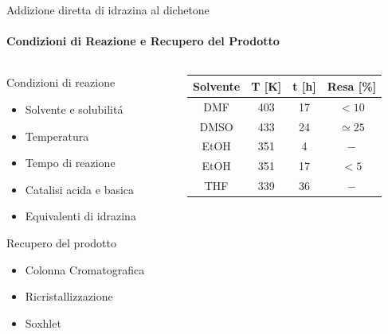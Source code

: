 \documentclass[aspectration=169]{beamer}
\begin{document}
\begin{frame}{Addizione diretta di idrazina al dichetone}
	\framesubtitle{Condizioni di Reazione e Recupero del Prodotto}
	\begin{columns}
		\hspace{1cm}
		\begin{column}{0.5\textwidth}
			Condizioni di reazione
			\begin{itemize}
				\small
				\item Solvente e solubilitá
				\item Temperatura
				\item Tempo di reazione
				\item Catalisi acida e basica
				\item Equivalenti di idrazina
			\end{itemize}
			\vspace{0.2cm}
			Recupero del prodotto
			\begin{itemize}
				\item Colonna Cromatografica
				\item Ricristallizzazione
				\item Soxhlet
			\end{itemize}
			\vspace*{-1cm}
		\end{column}
		\hspace{-3cm}
		\begin{column}{0.5\textwidth}
			\begin{footnotesize}
				\begin{center}
					\begin{tabular}{cccc}
						\toprule
						{Solvente} & T [K] & t [h] & Resa [\%]     \\
						\midrule
						DMF        & 403   & 17    & \(< 10\)      \\
						DMSO       & 433   & 24    & \(\simeq 25\) \\
						EtOH       & 351   & 4     & \(-\)         \\
						EtOH       & 351   & 17    & \(< 5\)       \\
						THF        & 339   & 36    & \(-\)         \\
						\bottomrule
					\end{tabular}
				\end{center}
			\end{footnotesize}
		\end{column}
	\end{columns}
\end{frame}
\end{document}
